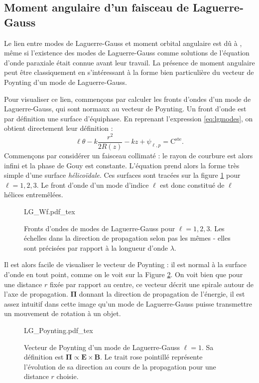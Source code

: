 \subsection{Moment angulaire d'un faisceau de Laguerre-Gauss}
Le lien entre modes de Laguerre-Gauss et moment orbital angulaire est dû à , même si l'existence des modes de Laguerre-Gauss comme solutions de l'équation d'onde paraxiale était connue avant leur travail. La présence de moment angulaire peut être classiquement en s'intéressant à la forme bien particulière du vecteur de Poynting d'un mode de Laguerre-Gauss.\par
Pour visualiser ce lien, commençons par calculer les fronts d'ondes d'un mode de Laguerre-Gauss, qui sont normaux au vecteur de Poynting.
Un front d'onde est par définition une surface d'équiphase. En reprenant l'expression \ref{eq:lgmodes}, on obtient directement leur définition :
\begin{equation}
\ell\theta-k\frac{r^2}{2R(z)}-kz+\psi _{\ell ,p} = \mathrm{C}^\mathrm{ste}.
\end{equation}
Commençons par considérer un faisceau collimaté : le rayon de courbure est alors infini et la phase de Gouy est constante. L'équation prend alors la forme très simple d'une surface \textit{hélicoïdale}. Ces surfaces sont tracées sur la figure \ref{Fig:LGwf} pour $\ell = 1,2,3$. Le front d'onde d'un mode d'indice $\ell$ est donc constitué de $\ell$ hélices entremêlées.
\begin{figure}[!ht]
\centering
\def\svgwidth{\columnwidth}
{LG_Wf.pdf_tex}
\caption{Fronts d'ondes de modes de Laguerre-Gauss pour $\ell=1,2,3$. Les échelles dans la direction de propagation selon pas les mêmes - elles sont précisées par rapport à la longueur d'onde $\lambda$.}
\label{Fig:LGwf}
\end{figure}

Il est alors facile de visualiser le vecteur de Poynting : il est normal à la surface d'onde en tout point, comme on le voit sur la Figure \ref{Fig:LGPoynting}. On voit bien que pour une distance $r$ fixée par rapport au centre, ce vecteur décrit une spirale autour de l'axe de propagation. $\bm{\Pi}$ donnant la direction de propagation de l'énergie, il est assez intuitif dans cette image qu'un mode de Laguerre-Gauss puisse transmettre un mouvement de rotation à un objet.

\begin{figure}[!ht]
\centering
\def\svgwidth{0.7\columnwidth}
{LG_Poynting.pdf_tex}
\caption{Vecteur de Poynting d'un mode de Laguerre-Gauss $\ell=1$. Sa définition est $\bm{\Pi} \propto \bm{E}\times\bm{B}$. Le trait rose pointillé représente l'évolution de sa direction au cours de la propagation pour une distance $r$ choisie.}
\label{Fig:LGPoynting}
\end{figure}

